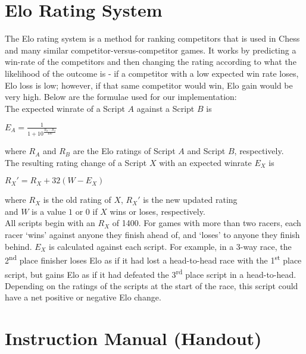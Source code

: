 \section{Elo Rating System}
The Elo rating system is a method for ranking competitors that is used in Chess and many similar competitor-versus-competitor games. It works by predicting a win-rate of the competitors and then changing the rating according to what the likelihood of the outcome is - if a competitor with a low expected win rate loses, Elo loss is low; however, if that same competitor would win, Elo gain would be very high. Below are the formulae used for our implementation:\\

\noindent The expected winrate of a Script $A$ against a Script $B$ is \\

{\Large\centerline{$E_{A} = \frac{1}{1 + 10^\frac{R_{B}-R_{A}}{400}}$}} \vspace{2mm}

\hspace*{5mm} where $R_{A}$ and $R_{B}$ are the Elo ratings of Script $A$ and Script $B$, respectively.\\

\noindent The resulting rating change of a Script $X$ with an expected winrate $E_{X}$ is \\

{\Large\centerline{$R_{X}' = R_{X} + 32(W - E_{X})$}} \vspace{2mm}

\hspace*{5mm} where $R_{X}$ is the old rating of $X$, $R_{X}'$ is the new updated rating \\
\hspace*{17mm} and $W$ is a value $1$ or $0$ if $X$ wins or loses, respectively.\\

All scripts begin with an $R_{X}$ of 1400.  For games with more than two racers, each racer `wins' against anyone they finish ahead of, and `loses' to anyone they finish behind. $E_{X}$ is calculated against each script. For example, in a 3-way race, the 2\textsuperscript{nd} place finisher loses Elo as if it had lost a head-to-head race with the 1\textsuperscript{st} place script, but gains Elo as if it had defeated the 3\textsuperscript{rd} place script in a head-to-head. Depending on the ratings of the scripts at the start of the race, this script could have a net positive or negative Elo change.
\section{Instruction Manual (Handout)}

